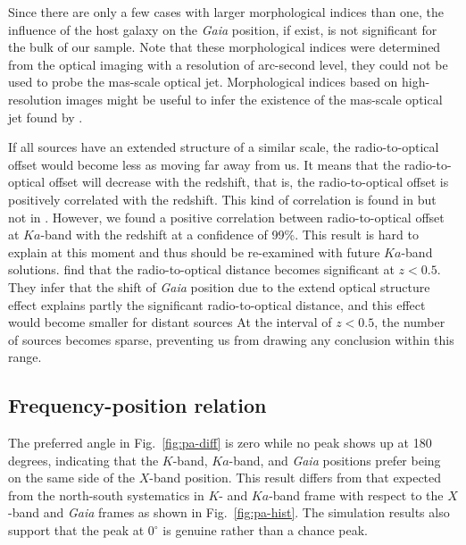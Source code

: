 \documentclass{aa}
\begin{document}
    Since there are only a few cases with larger morphological indices than one, the influence of the host galaxy on the \textit{Gaia} position, if exist, is not significant for the bulk of our sample.
    Note that these morphological indices were determined from the optical imaging with a resolution of arc-second level, they could not be used to probe the mas-scale optical jet.
    Morphological indices based on high-resolution images might be useful to infer the existence of the mas-scale optical jet found by \citet{2017MNRAS.467L..71P}.

    If all sources have an extended structure of a similar scale, the radio-to-optical offset would become less as moving far away from us.
    It means that the radio-to-optical offset will decrease with the redshift, that is, the radio-to-optical offset is positively correlated with the redshift.
    This kind of correlation is found in \citet{2014AJ....147...95Z} but not in \citet{2013A&A...553A..13O}.
    However, we found a positive correlation between radio-to-optical offset at $Ka$-band with the redshift at a confidence of 99\%.
    This result is hard to explain at this moment and thus should be re-examined with future $Ka$-band solutions.
    \citet{2017ApJ...835L..30M} find that the radio-to-optical distance becomes significant at $z<0.5$.
    They infer that the shift of \textit{Gaia} position due to the extend optical structure effect explains partly the significant radio-to-optical distance, and this effect would become smaller for distant sources
    At the interval of $z<0.5$, the number of sources becomes sparse, preventing us from drawing any conclusion within this range.


\subsection{Frequency-position relation} \label{subsec:freq-pos}

    The preferred angle in Fig.~\ref{fig:pa-diff} is zero while no peak shows up at 180 degrees, indicating that the $K$-band, $Ka$-band, and \textit{Gaia} positions prefer being on the same side of the $X$-band position.
    This result differs from that expected from the north-south systematics in $K$- and $Ka$-band frame with respect to the $X$-band and \textit{Gaia} frames as shown in Fig.~\ref{fig:pa-hist}.
    The simulation results also support that the peak at $0^{\circ}$ is genuine rather than a chance peak.
\end{document}
